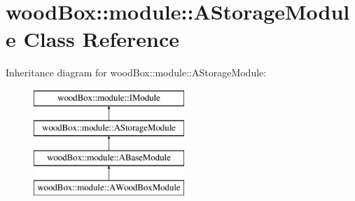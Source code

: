 \hypertarget{classwood_box_1_1module_1_1_a_storage_module}{}\section{wood\+Box\+:\+:module\+:\+:A\+Storage\+Module Class Reference}
\label{classwood_box_1_1module_1_1_a_storage_module}
Inheritance diagram for wood\+Box\+:\+:module\+:\+:A\+Storage\+Module\+:\begin{figure}[H]
\begin{center}
\leavevmode
\includegraphics[height=4.000000cm]{classwood_box_1_1module_1_1_a_storage_module}
\end{center}
\end{figure}

